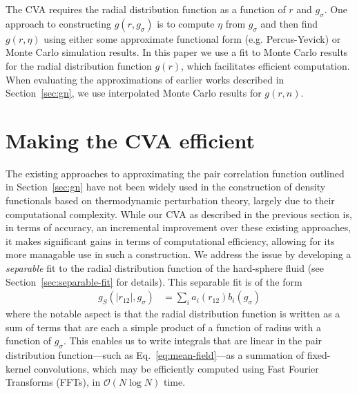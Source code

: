 \documentclass[letterpaper,twocolumn,amsmath,amssymb,pre,aps,10pt]{revtex4-1}
\begin{document}
The CVA requires the radial distribution function as a function of $r$
and $g_\sigma$.  One approach to constructing $g(r,g_\sigma)$ is to
compute $\eta$ from $g_\sigma$ and then find $g(r,\eta)$ using either
some approximate functional form (e.g. Percus-Yevick) or Monte Carlo
simulation results.  In this paper we use a fit to Monte Carlo results
for the radial distribution function $g(r)$, which facilitates
efficient computation.  When evaluating the approximations of earlier
works described in Section~\ref{sec:gn}, we use interpolated Monte
Carlo results for $g(r,n)$.



\section{Making the CVA efficient}
The existing approaches to approximating the pair correlation function
outlined in Section~\ref{sec:gn} have not been widely used in the
construction of density functionals based on thermodynamic
perturbation theory, largely due to their computational complexity.
While our CVA as described in the previous section is, in terms of
accuracy, an incremental improvement over these existing approaches,
it makes significant gains in terms of computational efficiency,
allowing for its more managable use in such a construction.  We
address the issue by developing a \emph{separable} fit to the radial
distribution function of the hard-sphere fluid (see
Section~\ref{sec:separable-fit} for details).  This separable fit is
of the form
\begin{align}
  g_S(|r_{12}|, g_\sigma) &= \sum_{i} a_i(r_{12}) b_i(g_\sigma)
\end{align}
where the notable aspect is that the radial distribution function is
written as a sum of terms that are each a simple product of a function
of radius with a function of $g_\sigma$.  This enables us to write
integrals that are linear in the pair distribution function---such as
Eq.~\ref{eq:mean-field}---as a summation of fixed-kernel convolutions,
which may be efficiently computed using Fast Fourier Transforms
(FFTs), in $\mathcal{O}(N\log N)$ time.
\end{document}
